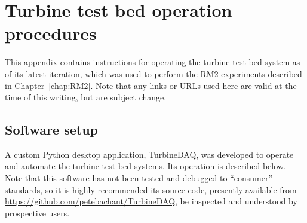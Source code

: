 \chapter{Turbine test bed operation procedures}
\doublespace

This appendix contains instructions for operating the turbine test bed system as
of its latest iteration, which was used to perform the RM2 experiments described
in Chapter~\ref{chap:RM2}. Note that any links or URLs used here are valid at
the time of this writing, but are subject change.


\section{Software setup}

A custom Python desktop application, TurbineDAQ, was developed to operate and
automate the turbine test bed systems. Its operation is described below. Note
that this software has not been tested and debugged to ``consumer'' standards,
so it is highly recommended its source code, presently available from
\url{https://github.com/petebachant/TurbineDAQ}, be inspected and understood by
prospective users.





